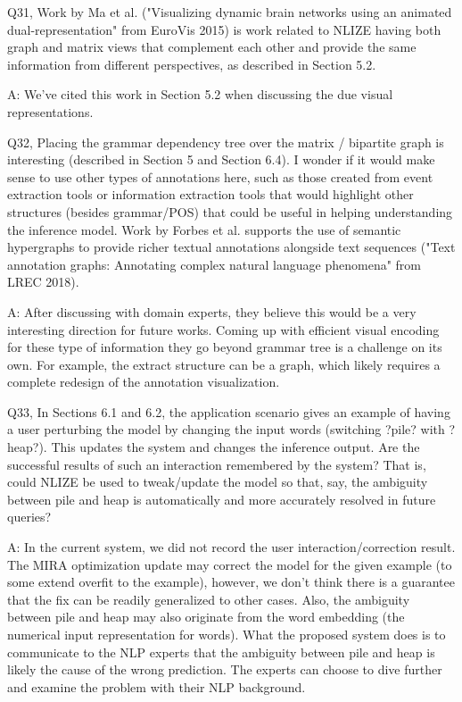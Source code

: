 Q31, Work by Ma et al. ("Visualizing dynamic brain networks using an animated dual-representation" from EuroVis 2015) is work related to NLIZE having both graph and matrix views that complement each other and provide the same information from different perspectives, as described in Section 5.2.

A: We've cited this work in Section 5.2 when discussing the due visual representations.

Q32, Placing the grammar dependency tree over the matrix / bipartite graph is interesting (described in Section 5 and Section 6.4). I wonder if it would make sense to use other types of annotations here, such as those created from event extraction tools or information extraction tools that would highlight other structures (besides grammar/POS) that could be useful in helping understanding the inference model. Work by Forbes et al. supports the use of semantic hypergraphs to provide richer textual annotations alongside text sequences ("Text annotation graphs: Annotating complex natural language phenomena" from LREC 2018).

A: After discussing with domain experts, they believe this would be a very interesting direction for future works. Coming up with efficient visual encoding for these type of information they go beyond grammar tree is a challenge on its own. For example, the extract structure can be a graph, which likely requires a complete redesign of the annotation visualization.

Q33, In Sections 6.1 and 6.2, the application scenario gives an example of having a user perturbing the model by changing the input words (switching ?pile? with ?heap?). This updates the system and changes the inference output. Are the successful results of such an interaction remembered by the system? That is, could NLIZE be used to tweak/update the model so that, say, the ambiguity between pile and heap is automatically and more accurately resolved in future queries?

A: In the current system, we did not record the user interaction/correction result. The MIRA optimization update may correct the model for the given example (to some extend overfit to the example), however, we don't think there is a guarantee that the fix can be readily generalized to other cases. Also, the ambiguity between pile and heap may also originate from the word embedding (the numerical input representation for words). What the proposed system does is to communicate to the NLP experts that the ambiguity between pile and heap is likely the cause of the wrong prediction. The experts can choose to dive further and examine the problem with their NLP background.

